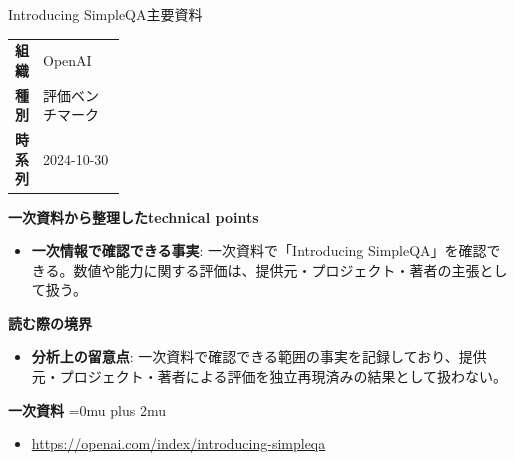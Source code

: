 \begin{technicalnote}{Introducing SimpleQA}{主要資料}
\begingroup
\begin{tabularx}{\linewidth}{@{}>{\bfseries}p{0.22\linewidth}X@{}}
組織 & OpenAI \\
種別 & 評価ベンチマーク \\
時系列 & 2024-10-30 \\
\end{tabularx}
\smallskip
{\bfseries 一次資料から整理したtechnical points}
\begin{itemize}[leftmargin=1.5em,itemsep=0.35em]
\item \textbf{一次情報で確認できる事実}: 一次資料で「Introducing SimpleQA」を確認できる。数値や能力に関する評価は、提供元・プロジェクト・著者の主張として扱う。
\end{itemize}
\begin{minipage}{\linewidth}
{\bfseries 読む際の境界}
\begin{itemize}[leftmargin=1.5em,itemsep=0.35em]
\item \textbf{分析上の留意点}: 一次資料で確認できる範囲の事実を記録しており、提供元・プロジェクト・著者による評価を独立再現済みの結果として扱わない。
\end{itemize}
\begin{samepage}
{\bfseries 一次資料}
\begingroup\sloppy
\Urlmuskip=0mu plus 2mu\relax
\begin{itemize}[leftmargin=1.5em,itemsep=0.25em]
\item {\scriptsize\url{https://openai.com/index/introducing-simpleqa}}
\end{itemize}
\endgroup
\end{samepage}
\end{minipage}
\endgroup
\end{technicalnote}
\medskip

